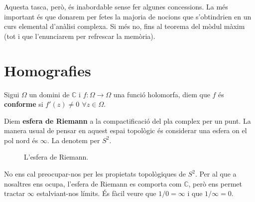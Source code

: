 \documentclass[dvipsnames, svgnames, leqno, a4paper, 12pt]{article}
\begin{document}
        Aquesta tasca, però, és inabordable sense fer algunes concessions. La més important és que donarem per fetes la majoria de nocions que s'obtindrien en un curs elemental d'anàlisi complexa. Si més no, fins al teorema del mòdul màxim (tot i que l'enunciarem per refrescar la memòria).



    \section{Homografies}
        Sigui  \(\Omega\) un domini de \(\mathbb{C}\) i \(f: \Omega\to\Omega\) una funció holomorfa, diem que \(f\) és \textbf{conforme} si \(f'(z) \neq 0\,\  \forall z\in\Omega\).
        
        Diem \textbf{esfera de Riemann} a la compactificació del pla complex per un punt. La manera usual de pensar en aquest espai topològic és considerar una esfera on el pol nord és \(\infty\). La denotem per \(S^2\).

        \begin{figure}[H]
            \centering


            \caption{L'esfera de Riemann.}
        \end{figure}
        No ens cal preocupar-nos per les propietats topològiques de \(S^2\). Per al que a nosaltres ens ocupa, l'esfera de Riemann es comporta com \(\mathbb{C}\), però ens permet tractar \(\infty\) estalviant-nos límits. És fàcil veure que \(1/0 = \infty\) i que \(1/\infty = 0\).
\end{document}
